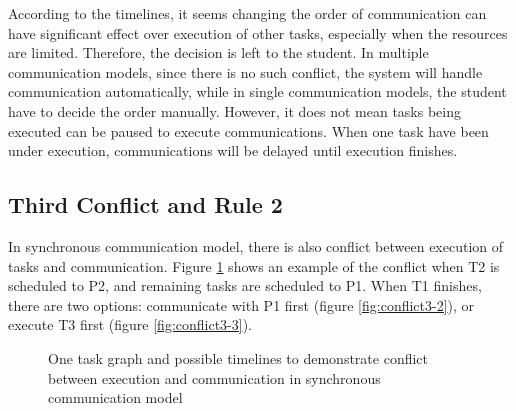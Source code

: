 \documentclass[msc,deptreport, cs]{infthesis}
\begin{document}
According to the timelines, it seems changing the order of communication can have significant effect over execution of other tasks, especially when the resources are limited. Therefore, the decision is left to the student. In multiple communication models, since there is no such conflict, the system will handle communication automatically, while in single communication models, the student have to decide the order manually. However, it does not mean tasks being executed can be paused to execute communications. When one task have been under execution, communications will be delayed until execution finishes.

\subsection{Third Conflict and Rule 2} \label{sec:rule2}

In synchronous communication model, there is also conflict between execution of tasks and communication. Figure \ref{fig:conflict3} shows an example of the conflict when T2 is scheduled to P2, and remaining tasks are scheduled to P1. When T1 finishes, there are two options: communicate with P1 first (figure \ref{fig:conflict3-2}), or execute T3 first (figure \ref{fig:conflict3-3}).

\begin{figure}[htpb]
  \centering
   \hspace{1em}
   \hspace{1em}
  \caption{One task graph and possible timelines to demonstrate conflict between execution and communication in synchronous communication model}
  \label{fig:conflict3}
\end{figure}
\end{document}
